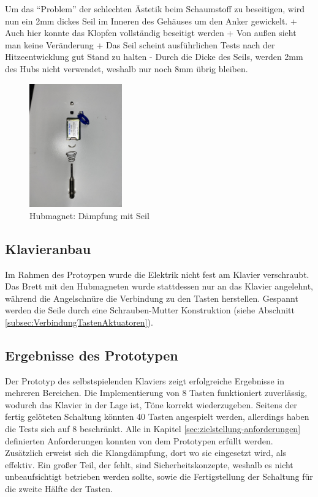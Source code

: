 Um das \enquote{Problem} der schlechten Ästetik beim Schaumstoff zu beseitigen, wird nun ein 2mm dickes Seil im Inneren des Gehäuses um den Anker gewickelt. \newline
+ Auch hier konnte das Klopfen vollständig beseitigt werden \newline
+ Von außen sieht man keine Veränderung \newline
+ Das Seil scheint ausführlichen Tests nach der Hitzeentwicklung gut Stand zu halten  \newline
- Durch die Dicke des Seils, werden 2mm des Hubs nicht verwendet, weshalb nur noch 8mm übrig bleiben.

\begin{figure}[htbp]
    \centering
    \includegraphics [width=4cm] {img/Hubmagnet_Seil_Daempfung.jpg}
    \caption{Hubmagnet: Dämpfung mit Seil}
\end{figure}


\subsection{Klavieranbau}
Im Rahmen des Protoypen wurde die Elektrik nicht fest am Klavier verschraubt.
Das Brett mit den Hubmagneten wurde stattdessen nur an das Klavier angelehnt, während die Angelschnüre die Verbindung zu den Tasten herstellen.
Gespannt werden die Seile durch eine Schrauben-Mutter Konstruktion (siehe Abschnitt \ref{subsec:VerbindungTastenAktuatoren}).

\subsection{Ergebnisse des Prototypen}
Der Prototyp des selbstspielenden Klaviers zeigt erfolgreiche Ergebnisse in mehreren Bereichen. Die Implementierung von
8 Tasten funktioniert zuverlässig, wodurch das Klavier in der Lage ist, Töne korrekt wiederzugeben. Seitens der
fertig gelöteten Schaltung könnten 40 Tasten angespielt werden, allerdings haben die Tests sich auf 8 beschränkt.
Alle in Kapitel \ref{sec:zielstellung-anforderungen} definierten Anforderungen konnten von dem Prototypen erfüllt werden. %
Zusätzlich erweist sich die Klangdämpfung, dort wo sie eingesetzt wird, als effektiv. \newline
Ein großer Teil, der fehlt, sind Sicherheitskonzepte, weshalb es nicht unbeaufsichtigt betrieben
werden sollte, sowie die Fertigstellung der Schaltung für die zweite Hälfte der Tasten.

